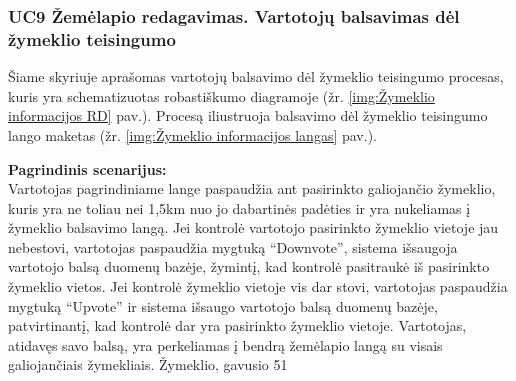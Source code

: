 \documentclass{VUMIFPSkursinis}
\begin{document}
\subsubsection{UC9 Žemėlapio redagavimas. Vartotojų balsavimas dėl žymeklio teisingumo}
	Šiame skyriuje aprašomas vartotojų balsavimo dėl žymeklio teisingumo procesas, kuris yra schematizuotas robastiškumo diagramoje (žr. \ref{img:Žymeklio informacijos RD} pav.). 
	Procesą iliustruoja balsavimo dėl žymeklio teisingumo lango maketas (žr. \ref{img:Žymeklio informacijos langas} pav.).

	\textbf{Pagrindinis scenarijus:}\\
	Vartotojas pagrindiniame lange paspaudžia ant pasirinkto galiojančio žymeklio, kuris yra ne toliau nei 1,5km nuo jo dabartinės padėties ir yra nukeliamas į žymeklio balsavimo langą. Jei kontrolė vartotojo pasirinkto žymeklio vietoje jau nebestovi, vartotojas paspaudžia mygtuką “Downvote”, sistema išsaugoja vartotojo balsą duomenų bazėje, žymintį, kad kontrolė pasitraukė iš pasirinkto žymeklio vietos. Jei kontrolė žymeklio vietoje vis dar stovi, vartotojas paspaudžia mygtuką “Upvote” ir sistema išsaugo vartotojo balsą duomenų bazėje, patvirtinantį, kad kontrolė dar yra pasirinkto žymeklio vietoje. Vartotojas, atidavęs savo balsą, yra perkeliamas į bendrą žemėlapio langą su visais galiojančiais žymekliais. Žymeklio, gavusio 51%
	
\end{document}
